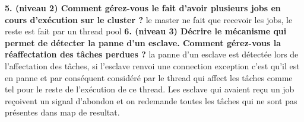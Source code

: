 \documentclass{article}
\begin{document}
\newline
\textbf{5. (niveau 2) Comment gérez-vous le fait d’avoir plusieurs jobs en cours d’exécution sur le
cluster ?}
\newline
le master ne fait que recevoir les jobs, le reste est fait par un thread pool
\newline
\textbf{6. (niveau 3) Décrire le mécanisme qui permet de détecter la panne d’un esclave. Comment
gérez-vous la réaffectation des tâches perdues ?}
\newline
la panne d'un esclave est détectée lors de l'affectation des tâches, si l'esclave renvoi une connection exception c'est qu'il est en panne 
et par conséquent considéré par le thread qui affect les tâches comme tel pour le reste de l'exécution de ce thread.
Les esclave qui avaient reçu un job reçoivent un signal d'abondon et on redemande toutes les tâches qui ne sont pas présentes dans map de resultat.
\end{document}
